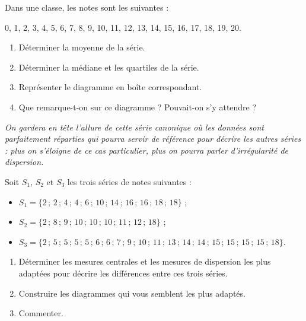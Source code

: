\begin{exo}
 Dans une classe, les notes sont les suivantes : \begin{center}
0, 1, 2, 3, 4, 5, 6, 7, 8, 9, 10, 11, 12, 13, 14, 15, 16, 17, 18, 19, 20.                                                                                                                          \end{center}
\begin{enumerate}
	\item D\'eterminer la moyenne de la s\'erie.
	\item D\'eterminer la m\'ediane et les quartiles de la s\'erie.
	\item Repr\'esenter le diagramme en bo\^ite correspondant.
	\item Que remarque-t-on sur ce diagramme ? Pouvait-on s'y attendre ?
\end{enumerate}
\emph{On gardera en t\^ete l'allure de cette s\'erie \og canonique \fg{} o\`u les donn\'ees sont parfaitement r\'eparties qui pourra servir de r\'ef\'erence pour d\'ecrire les autres s\'eries : plus on s'\'eloigne de ce cas particulier, plus on pourra parler \og d'irr\'egularit\'e \fg{} de dispersion.}
\end{exo}


\begin{exo}
Soit $S_1$, $S_2$ et $S_3$ les trois s\'eries de notes suivantes :
\begin{itemize}
 \item $S_1 =\{2\,;\,2\,;\,4\,;\,4\,;\,6\,;\,10\,;\,14\,;\,16\,;\,16\,;\,18\,;\,18\}$ ;
 \item $S_2 =\{2\,;\,8\,;\,9\,;\,10\,;\,10\,;\,10\,;\,11\,;\,12\,;\,18\}$ ;
 \item $S_3 =\{2\,;\,5\,;\,5\,;\,5\,;\,5\,;\,6\,;\,6\,;\,7\,;\,9\,;\,10\,;\,11\,;\,13\,;\,14\,;\,14\,;\,15\,;\,15\,;\,15\,;\,15\,;\,18\}$.
\end{itemize}


\begin{enumerate}
 \item D\'eterminer les mesures centrales et les mesures de dispersion les plus adapt\'ees pour d\'ecrire les diff\'erences entre ces trois s\'eries.
 \item Construire les diagrammes qui vous semblent les plus adapt\'es.
 \item Commenter.
\end{enumerate}
\end{exo}%

